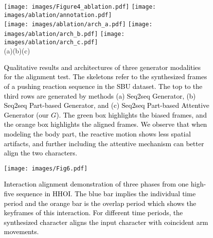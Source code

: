 \documentclass[times,twocolumn,final]{elsarticle}
\begin{document}
\begin{figure*}[t]
  \centering
  \mbox{}
  \texttt{[image: images/Figure4\_ablation.pdf]}
  \texttt{[image: images/ablation/annotation.pdf]}
\hfill \\
\hfill
  \texttt{[image: images/ablation/arch\_a.pdf]}
\hfill 
  \texttt{[image: images/ablation/arch\_b.pdf]}
\hfill 
  \texttt{[image: images/ablation/arch\_c.pdf]}
\hfill\hfill\hfill \\
\qquad\qquad(a)\qquad\qquad\qquad\qquad\qquad\qquad\qquad(b)\qquad\qquad\qquad\qquad\qquad\qquad\qquad(c)\qquad\qquad
\mbox{}
  \caption{\label{fig:4} \textcolor{black}{Qualitative results and architectures of three generator modalities for the alignment test. The skeletons refer to the synthesized frames of a pushing reaction sequence in the SBU dataset. The top to the third rows are generated by methods (a) Seq2seq Generator, (b) Seq2seq Part-based Generator, and (c) Seq2seq Part-based Attentive Generator (our $G$). The green box highlights the biased frames, and the orange box highlights the aligned frames. We observe that when modeling the body part, the reactive motion shows less spatial artifacts, and further including the attentive mechanism can better align the two characters.}}
\end{figure*}


\begin{figure}[t]
\centering\texttt{[image: images/Fig6.pdf]}
\caption{\textcolor{black}{Interaction alignment demonstration of three phases from one high-five sequence in HHOI. The blue bar implies the individual time period and the orange bar is the overlap period which shows the keyframes of this interaction. For different time periods, the synthesized character aligns the input character with coincident arm movements.}}
\label{fig:6} 
\end{figure}
\end{document}
